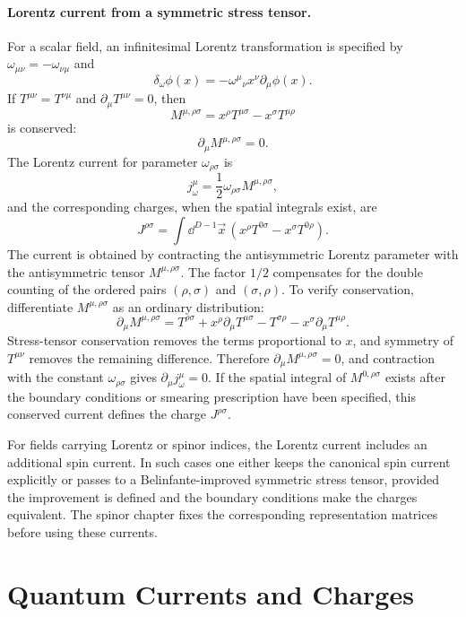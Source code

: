 \paragraph{Lorentz current from a symmetric stress tensor.}
For a scalar field, an infinitesimal Lorentz transformation is specified by
\(\omega_{\mu\nu}=-\omega_{\nu\mu}\) and
\[
  \delta_\omega\phi(x)
  =
  -\omega^\mu{}_\nu x^\nu\partial_\mu\phi(x).
\]
If \(T^{\mu\nu}=T^{\nu\mu}\) and \(\partial_\mu T^{\mu\nu}=0\), then
\[
  M^{\mu,\rho\sigma}
  =
  x^\rho T^{\mu\sigma}-x^\sigma T^{\mu\rho}
\]
is conserved:
\[
  \partial_\mu M^{\mu,\rho\sigma}=0.
\]
The Lorentz current for parameter \(\omega_{\rho\sigma}\) is
\[
  j^\mu_\omega
  =
  \frac12\omega_{\rho\sigma}M^{\mu,\rho\sigma},
\]
and the corresponding charges, when the spatial integrals exist, are
\[
  J^{\rho\sigma}
  =
  \int\dd^{D-1}\vec x\,
  \left(
    x^\rho T^{0\sigma}-x^\sigma T^{0\rho}
  \right).
\]
The current is obtained by contracting the antisymmetric Lorentz parameter
with the antisymmetric tensor \(M^{\mu,\rho\sigma}\).  The factor \(1/2\)
compensates for the double counting of the ordered pairs
\((\rho,\sigma)\) and \((\sigma,\rho)\).  To verify conservation, differentiate
\(M^{\mu,\rho\sigma}\) as an ordinary distribution:
\[
  \partial_\mu M^{\mu,\rho\sigma}
  =
  T^{\rho\sigma}+x^\rho\partial_\mu T^{\mu\sigma}
  -
  T^{\sigma\rho}-x^\sigma\partial_\mu T^{\mu\rho}.
\]
Stress-tensor conservation removes the terms proportional to \(x\), and
symmetry of \(T^{\mu\nu}\) removes the remaining difference.  Therefore
\(\partial_\mu M^{\mu,\rho\sigma}=0\), and contraction with the constant
\(\omega_{\rho\sigma}\) gives \(\partial_\mu j^\mu_\omega=0\).  If the spatial
integral of \(M^{0,\rho\sigma}\) exists after the boundary conditions or
smearing prescription have been specified, this conserved current defines
the charge \(J^{\rho\sigma}\).

\begin{remark}
\label{rem:spin-terms-belinfante}
For fields carrying Lorentz or spinor indices, the Lorentz current includes an
additional spin current.  In such cases one either keeps the canonical spin
current explicitly or passes to a Belinfante-improved symmetric stress tensor,
provided the improvement is defined and the boundary conditions make the
charges equivalent.  The spinor chapter fixes the corresponding representation
matrices before using these currents.
\end{remark}

\section{Quantum Currents and Charges}

